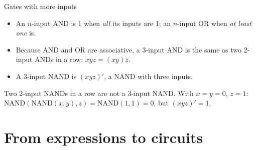 \documentclass[10pt]{wosm-slides}
\begin{document}
\begin{frame}{Gates with more inputs}
  \begin{itemize}
    \item An $n$-input AND is 1 when \emph{all} its inputs are 1; an $n$-input OR
      when \emph{at least one} is.
    \item Because AND and OR are associative, a 3-input AND is the same as two
      2-input ANDs in a row: $xyz = (xy)z$.
    \item A 3-input NAND is $(xyz)'$, a NAND with three inputs.
  \end{itemize}

  \begin{warning}
    Two 2-input NANDs in a row are not a 3-input NAND. With $x = y = 0$, $z = 1$:
    $\mathrm{NAND}(\mathrm{NAND}(x, y), z) = \mathrm{NAND}(1, 1) = 0$, but
    $(xyz)' = 1$.
  \end{warning}
\end{frame}

\section{From expressions to circuits}
\end{document}
